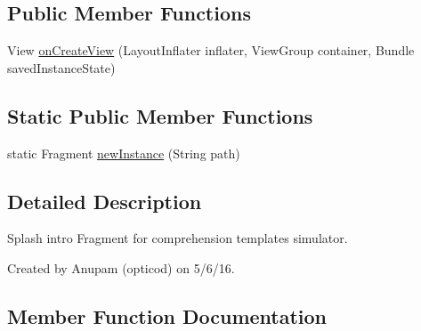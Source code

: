 \subsection*{Public Member Functions}
\begin{DoxyCompactItemize}
\item 
View \hyperlink{classorg_1_1buildmlearn_1_1toolkit_1_1comprehensiontemplate_1_1fragment_1_1SplashFragment_a89db68e40dbfeec9ab4a28dab27a9a6b}{on\+Create\+View} (Layout\+Inflater inflater, View\+Group container, Bundle saved\+Instance\+State)
\end{DoxyCompactItemize}
\subsection*{Static Public Member Functions}
\begin{DoxyCompactItemize}
\item 
static Fragment \hyperlink{classorg_1_1buildmlearn_1_1toolkit_1_1comprehensiontemplate_1_1fragment_1_1SplashFragment_a85320541c499698a33341df8b41110c2}{new\+Instance} (String path)
\end{DoxyCompactItemize}


\subsection{Detailed Description}
Splash intro Fragment for comprehension template\textquotesingle{}s simulator. 

Created by Anupam (opticod) on 5/6/16. 

\subsection{Member Function Documentation}
